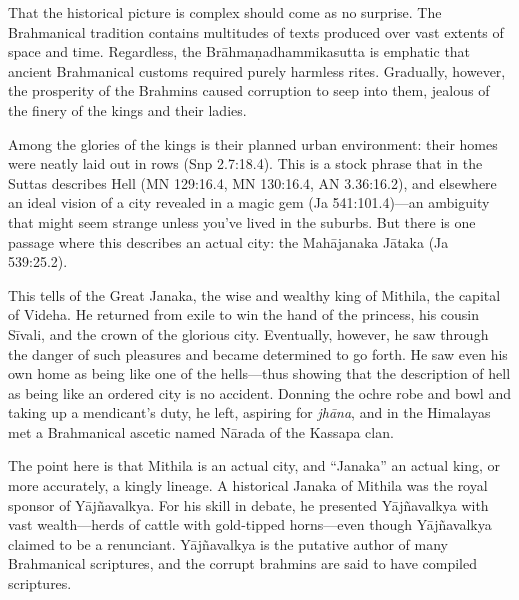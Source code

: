 \documentclass[12pt,openany]{book}%
\begin{document}
That the historical picture is complex should come as no surprise. The Brahmanical tradition contains multitudes of texts produced over vast extents of space and time. Regardless, the \textsanskrit{Brāhmaṇadhammikasutta} is emphatic that ancient Brahmanical customs required purely harmless rites. Gradually, however, the prosperity of the Brahmins caused corruption to seep into them, jealous of the finery of the kings and their ladies.

Among the glories of the kings is their planned urban environment: their homes were neatly laid out in rows (Snp 2.7:18.4). This is a stock phrase that in the Suttas describes Hell (MN 129:16.4, MN 130:16.4, AN 3.36:16.2), and elsewhere an ideal vision of a city revealed in a magic gem (Ja 541:101.4)—an ambiguity that might seem strange unless you’ve lived in the suburbs. But there is one passage where this describes an actual city: the \textsanskrit{Mahājanaka} \textsanskrit{Jātaka} (Ja 539:25.2).

This tells of the Great Janaka, the wise and wealthy king of Mithila, the capital of Videha. He returned from exile to win the hand of the princess, his cousin \textsanskrit{Sīvali}, and the crown of the glorious city. Eventually, however, he saw through the danger of such pleasures and became determined to go forth. He saw even his own home as being like one of the hells—thus showing that the description of hell as being like an ordered city is no accident. Donning the ochre robe and bowl and taking up a mendicant’s duty, he left, aspiring for \textit{\textsanskrit{jhāna}}, and in the Himalayas met a Brahmanical ascetic named \textsanskrit{Nārada} of the Kassapa clan.

The point here is that Mithila is an actual city, and “Janaka” an actual king, or more accurately, a kingly lineage. A historical Janaka of Mithila was the royal sponsor of \textsanskrit{Yājñavalkya}. For his skill in debate, he presented \textsanskrit{Yājñavalkya} with vast wealth—herds of cattle with gold-tipped horns—even though \textsanskrit{Yājñavalkya} claimed to be a renunciant. \textsanskrit{Yājñavalkya} is the putative author of many Brahmanical scriptures, and the corrupt brahmins are said to have compiled scriptures.
\end{document}
